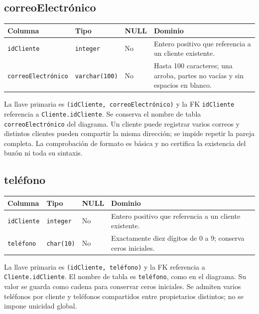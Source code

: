 \subsection{correoElectrónico}

\noindent\begin{tabular}{@{}p{}p{}p{}p{}@{}}
\hline
\textbf{Columna} & \textbf{Tipo} & \textbf{NULL} & \textbf{Dominio} \\
\hline
\texttt{idCliente} & \texttt{integer} & No & Entero positivo que referencia a un cliente existente. \\
\texttt{correoElectrónico} & \texttt{varchar(100)} & No & Hasta 100 caracteres; una arroba, partes no vacías y sin espacios en blanco. \\
\hline
\end{tabular}

La llave primaria es \texttt{(idCliente, correoElectrónico)} y la FK
\texttt{idCliente} referencia a \texttt{Cliente.idCliente}. Se conserva
el nombre de tabla \texttt{correoElectrónico} del diagrama. Un cliente
puede registrar varios correos y distintos clientes pueden compartir
la misma dirección; se impide repetir la pareja completa. La comprobación
de formato es básica y no certifica la existencia del buzón ni toda su
sintaxis.

\subsection{teléfono}

\noindent\begin{tabular}{@{}p{}p{}p{}p{}@{}}
\hline
\textbf{Columna} & \textbf{Tipo} & \textbf{NULL} & \textbf{Dominio} \\
\hline
\texttt{idCliente} & \texttt{integer} & No & Entero positivo que referencia a un cliente existente. \\
\texttt{teléfono} & \texttt{char(10)} & No & Exactamente diez dígitos de 0 a 9; conserva ceros iniciales. \\
\hline
\end{tabular}

La llave primaria es \texttt{(idCliente, teléfono)} y la FK referencia
a \texttt{Cliente.idCliente}. El nombre de tabla es \texttt{teléfono},
como en el diagrama. Su valor se guarda como cadena para conservar ceros
iniciales. Se admiten varios teléfonos por cliente y teléfonos compartidos
entre propietarios distintos; no se impone unicidad global.

